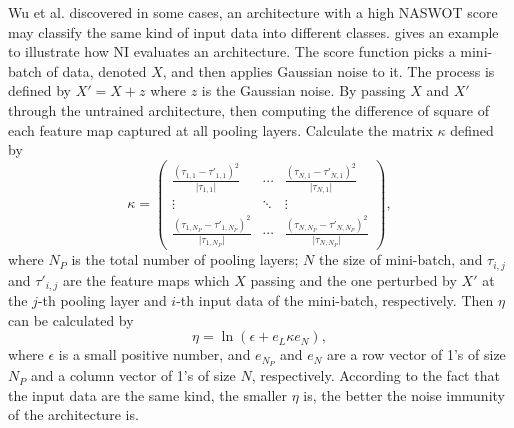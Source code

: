 \documentclass[sigconf]{acmart}
\begin{document}
    Wu et al. \cite{10092788} discovered in some cases, an architecture with a high %
    NASWOT score may classify the same kind of input data into different classes. 
     gives an example to illustrate how NI evaluates an architecture. 
    The score function picks a mini-batch of data, denoted $X$, and then applies 
    Gaussian noise to it. The process is defined by $X'=X+z$ where $z$ is the 
    Gaussian noise. By passing $X$ and $X'$ through the untrained architecture, 
    then computing the difference of square of each feature map captured at all 
    pooling layers. Calculate the matrix $\kappa$ defined by 
    \begin{equation}
        \label{equ:ni_kappa}
        \kappa=\begin{pmatrix}\frac{(\tau_{1,1}-\tau'_{1,1})^2}{\lvert \tau_{1,1}\rvert}&\cdots&\frac{(\tau_{N,1}-\tau'_{N,1})^2}{\lvert \tau_{N,1}\rvert}\\\vdots&\ddots&\vdots\\\frac{(\tau_{1,N_P}-\tau'_{1,N_P})^2}{\lvert \tau_{1,N_P}\rvert}&\cdots&\frac{(\tau_{N,N_P}-\tau'_{N,N_P})^2}{\lvert \tau_{N,N_P}\rvert}\end{pmatrix},
    \end{equation}
    where $N_P$ is the total number of pooling layers; $N$ the size of mini-batch, 
    and $\tau_{i,j}$ and $\tau'_{i,j}$ are the feature maps which $X$ passing and 
    the one perturbed by $X'$ at the $j$-th pooling layer and $i$-th input 
    data of the mini-batch, respectively. 
    Then $\eta$ can be calculated by 
    \begin{equation}
        \label{equ:ni_eta}
        \eta=\ln(\epsilon+e_L\kappa e_N),
    \end{equation}
    where $\epsilon$ is a small positive number, and $e_{N_P}$ and $e_N$ are a row 
    vector of 1's of size $N_P$ and a column vector of 1's of size $N$, respectively. 
    According to the fact that the input data are the same kind, the smaller $\eta$ 
    is, the better the noise immunity of the architecture is. 
\end{document}
